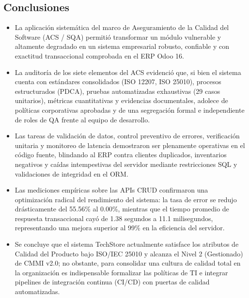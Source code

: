\documentclass{article}
\begin{document}
\subsection{Conclusiones}
\begin{itemize}
    \item La aplicación sistemática del marco de Aseguramiento de la Calidad del Software (ACS / SQA) permitió transformar un módulo vulnerable y altamente degradado en un sistema empresarial robusto, confiable y con exactitud transaccional comprobada en el ERP Odoo 16.
    \item La auditoría de los siete elementos del ACS evidenció que, si bien el sistema cuenta con estándares consolidados (ISO 12207, ISO 25010), procesos estructurados (PDCA), pruebas automatizadas exhaustivas (29 casos unitarios), métricas cuantitativas y evidencias documentales, adolece de políticas corporativas aprobadas y de una segregación formal e independiente de roles de QA frente al equipo de desarrollo.
    \item Las tareas de validación de datos, control preventivo de errores, verificación unitaria y monitoreo de latencia demostraron ser plenamente operativas en el código fuente, blindando al ERP contra clientes duplicados, inventarios negativos y caídas intempestivas del servidor mediante restricciones SQL y validaciones de integridad en el ORM.
    \item Las mediciones empíricas sobre las APIs CRUD confirmaron una optimización radical del rendimiento del sistema: la tasa de error se redujo drásticamente del 55.56\% al 0.00\%, mientras que el tiempo promedio de respuesta transaccional cayó de 1.38 segundos a 11.1 milisegundos, representando una mejora superior al 99\% en la eficiencia del servidor.
    \item Se concluye que el sistema TechStore actualmente satisface los atributos de Calidad del Producto bajo ISO/IEC 25010 y alcanza el Nivel 2 (Gestionado) de CMMI v2.0; no obstante, para consolidar una cultura de calidad total en la organización es indispensable formalizar las políticas de TI e integrar pipelines de integración continua (CI/CD) con puertas de calidad automatizadas.
\end{itemize}
\end{document}
